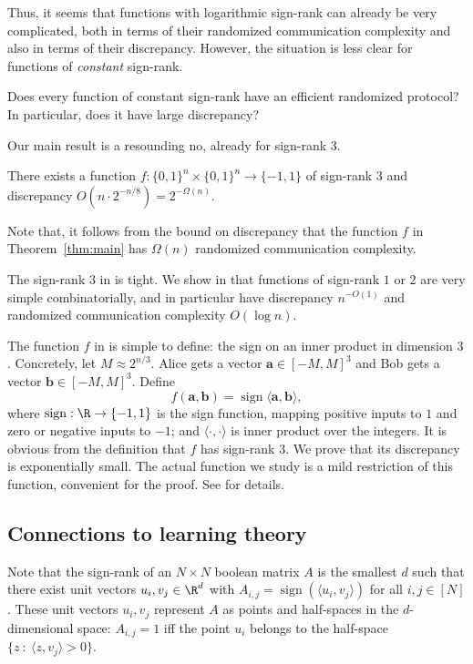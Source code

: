 \documentclass{toc}
\DeclareMathOperator{\sign}{sign}
\begin{document}
Thus, it seems that functions with logarithmic sign-rank can already be very complicated, both in terms of their randomized communication complexity and also in terms of their discrepancy. However, the situation is less clear for functions of \emph{constant} sign-rank.

\begin{problem}
Does every function of constant sign-rank have an efficient randomized protocol? In particular, does it have large discrepancy?
\end{problem}

Our main result is a resounding no, already for sign-rank $3$.


\begin{theorem}\label{thm:main}
There exists a  function $f:\{0,1\}^n \times \{0,1\}^n \to \{-1,1\}$  of sign-rank $3$ and discrepancy $O(n \cdot 2^{-n/8})=2^{-\Omega(n)}$. 
\end{theorem}
Note that, it follows from the bound on discrepancy that the function $f$ in Theorem~\ref{thm:main} has $\Omega(n)$ randomized communication complexity. 

The sign-rank $3$ in  is tight. We show in  that functions of sign-rank $1$ or $2$ are very simple
combinatorially, and in particular have discrepancy $n^{-O(1)}$ and randomized communication complexity $O(\log n)$.

The function $f$ in  is simple to define: the sign on an inner product in dimension $3$. Concretely, let $M \approx 2^{n/3}$. Alice gets a vector $\mathbf{a} \in [-M,M]^3$  and Bob gets a vector $\mathbf{b}  \in [-M,M]^3$.
Define
$$
f(\mathbf{a},\mathbf{b}) = \sign \langle \mathbf{a},\mathbf{b} \rangle,
$$
where $\sign:\R \to \{-1,1\}$ is the sign function, mapping positive inputs to $1$ and zero or negative inputs to $-1$; and $\langle \cdot,\cdot \rangle $ is inner product over the integers.
It is obvious from the definition that $f$ has sign-rank $3$. We prove that its discrepancy is exponentially small.
The actual function we study is a mild restriction of this function, convenient for the proof. See  for details.


\subsection{Connections to learning theory}

Note that the sign-rank of an $N \times N$  boolean matrix  $A$ is the
smallest $d$ such that there exist 
%
%
unit  %
vectors $u_i, v_j\in \R^d$ with $A_{i,j}=\sign(\langle u_i,v_j \rangle)$ for all  $i,j \in [N]$. These unit vectors $u_i,v_j$ represent $A$ as points and half-spaces in the $d$-dimensional space:   $A_{i,j}=1$ iff the point $u_i$ belongs to the half-space $\{z \ : \ \langle z,v_j \rangle > 0 \}$.   
\end{document}
